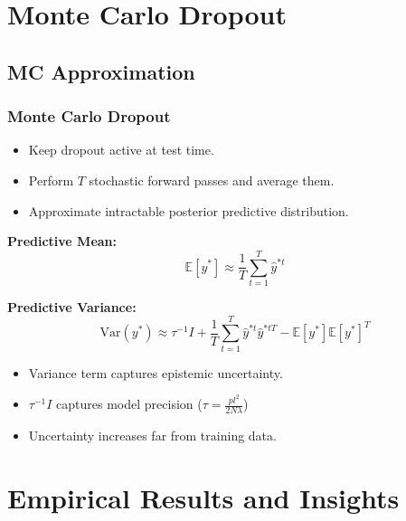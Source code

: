 \documentclass[
	11pt, %
]{beamer}
\begin{document}

\section{Monte Carlo Dropout}

\subsection{MC Approximation}

\begin{frame}
	\frametitle{Monte Carlo Dropout}

	\begin{itemize}
		\item Keep dropout \alert{active} at test time.
		\item Perform $T$ stochastic forward passes and average them.
		\item Approximate intractable posterior predictive distribution.
	\end{itemize}

	\bigskip

	\textbf{Predictive Mean:}
	\[
	\mathbb{E}[y^*]
	\approx
	\frac{1}{T}\sum_{t=1}^{T}\hat{y}^{*t}
	\]

	\textbf{Predictive Variance:}
	\[
	\text{Var}(y^*)
	\approx
	\tau^{-1}I
	+
	\frac{1}{T}\sum_{t=1}^{T}
	\hat{y}^{*t}\hat{y}^{*tT}
	-
	\mathbb{E}[y^*]\mathbb{E}[y^*]^T
	\]

	\begin{itemize}
	\item Variance term captures \alert{epistemic uncertainty}.
	\item $\tau^{-1} I$ captures model precision ($\tau = \frac{pl^2}{2N\lambda}$)
	\item Uncertainty increases far from training data.
\end{itemize}
\end{frame}


\section{Empirical Results and Insights}
\end{document}
